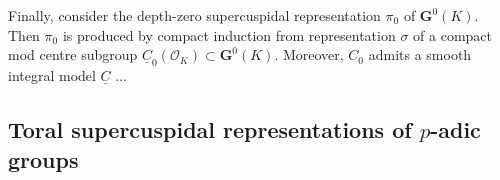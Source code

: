 \documentclass[10pt]{amsart}
\theoremstyle{plain}
\theoremstyle{definition}
\newcommand{\OK}{\mathcal{O}_K}
\newcommand{\G}{\textbf{G}}
\begin{document}
Finally, consider the depth-zero supercuspidal representation $\pi_0$ of $\G^0(K)$.
Then $\pi_0$ is produced by compact induction from representation $\sigma$ of a compact mod centre subgroup $\underline{C}_0(\OK) \subset \G^0(K)$. Moreover, $C_0$ admits a smooth integral model $\underline{C}$ ...

\subsection{Toral supercuspidal representations of $p$-adic groups}




\end{document}
